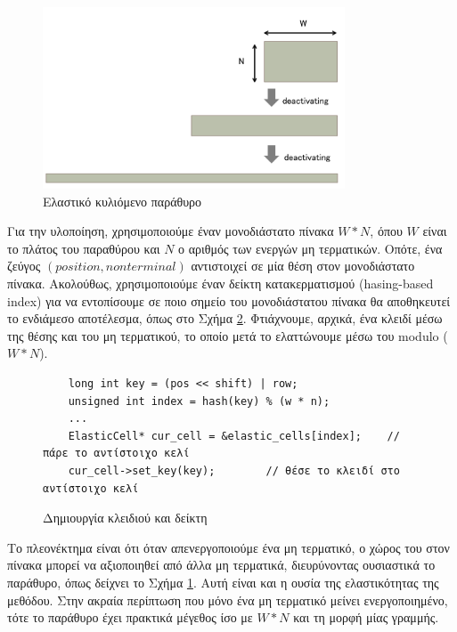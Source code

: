 \begin{figure}[h]
	\centering
	\includegraphics[width=0.8\textwidth]{pics/elastic_slide_window} 
	\caption{Ελαστικό κυλιόμενο παράθυρο \cite{Kuramitsu2015a}}
	\label{fig:elastic_slide_window}
\end{figure}

Για την υλοποίηση, χρησιμοποιούμε έναν μονοδιάστατο πίνακα $W*N$, όπου $W$ είναι το πλάτος του παραθύρου και $N$ ο αριθμός των ενεργών μη τερματικών.
Οπότε, ένα ζεύγος $(position, non terminal)$ αντιστοιχεί σε μία θέση στον μονοδιάστατο πίνακα.
Ακολούθως, χρησιμοποιούμε έναν δείκτη κατακερματισμού (hasing-based index) για να εντοπίσουμε σε ποιο σημείο του μονοδιάστατου πίνακα θα αποθηκευτεί το ενδιάμεσο αποτέλεσμα, όπως στο Σχήμα \ref{fig:elastic_1}.
Φτιάχνουμε, αρχικά, ένα κλειδί μέσω της θέσης και του μη τερματικού, το οποίο μετά το ελαττώνουμε μέσω του modulo ($W*N$).

\begin{figure}[h]
\setlength\partopsep{-\topsep}%
\begin{verbatim}
    long int key = (pos << shift) | row;
    unsigned int index = hash(key) % (w * n);
    ...
    ElasticCell* cur_cell = &elastic_cells[index];    // πάρε το αντίστοιχο κελί
    cur_cell->set_key(key);        // θέσε το κλειδί στο αντίστοιχο κελί
\end{verbatim}
\caption{Δημιουργία κλειδιού και δείκτη}
\label{fig:elastic_1}
\end{figure}

Το πλεονέκτημα είναι ότι όταν απενεργοποιούμε ένα μη τερματικό, ο χώρος του στον πίνακα μπορεί να αξιοποιηθεί από άλλα μη τερματικά, διευρύνοντας ουσιαστικά το παράθυρο, όπως δείχνει το Σχήμα \ref{fig:elastic_slide_window}. 
Αυτή είναι και η ουσία της ελαστικότητας της μεθόδου. 
Στην ακραία περίπτωση που μόνο ένα μη τερματικό μείνει ενεργοποιημένο, τότε το παράθυρο έχει πρακτικά μέγεθος ίσο με $W*N$ και τη μορφή μίας γραμμής.

